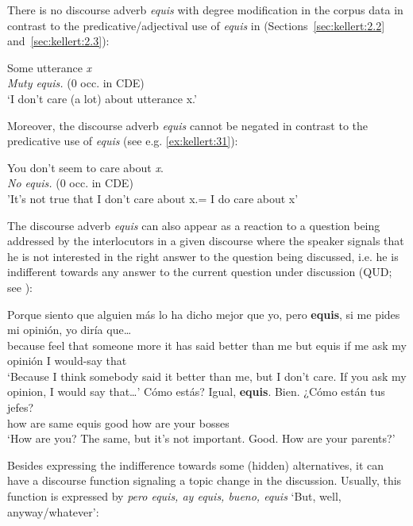 \documentclass[output=paper]{langsci/langscibook}
\begin{document}
There is no discourse adverb \textit{equis} with degree modification in the corpus data in contrast to the predicative/adjectival use of \textit{equis} in (Sections~\ref{sec:kellert:2.2} and~\ref{sec:kellert:2.3}):

\ea\label{ex:kellert:30}
\begin{xlist}
 Some utterance \textit{x} \\
 \textit{Muty equis.} (0 occ. in CDE)\\
\glt ‘I don’t care (a lot) about utterance x.’
\end{xlist}
\z

Moreover, the discourse adverb \textit{equis} cannot be negated in contrast to the predicative use of \textit{equis} (see e.g. \ref{ex:kellert:31}):
\ea\label{ex:kellert:31}
\begin{xlist}
 You don't seem to care about \textit{x}. \\
 \textit{No equis.} (0 occ. in CDE)\\
         \glt 'It's not true that I don't care about x.= I do care about x'
\end{xlist}
\z

The discourse adverb \textit{equis} can also appear as a reaction to a question being addressed by the interlocutors in a given discourse where the speaker signals that he is not interested in the right answer to the question being discussed, i.e. he is indifferent towards any answer to the current question under discussion (QUD; see \citealt{Roberts1996}):

\ea\label{ex:kellert:32}
\gll Porque siento que alguien más lo ha dicho mejor que yo, pero \textbf{equis}, si me pides mi opinión, yo diría que…\\
because feel that someone more it has said better than me but equis	if me ask my opinión I would-say that\\
\glt ‘Because I think somebody said it better than me, but I don’t care. If you ask my opinion, I would say that…’
\ex 
{}Cómo	estás? Igual, \textbf{equis}. Bien. {¿}Cómo están tus jefes?\\
how are same equis good how are your bosses\\
\glt ‘How are you? The same, but it’s not important. Good. How are your parents?’
\z

Besides expressing the indifference towards some (hidden) alternatives, it can have a discourse function signaling a topic change in the discussion. Usually, this function is expressed by \textit{pero equis, ay equis, bueno, equis} ‘But, well, anyway/whatever’:
\end{document}
